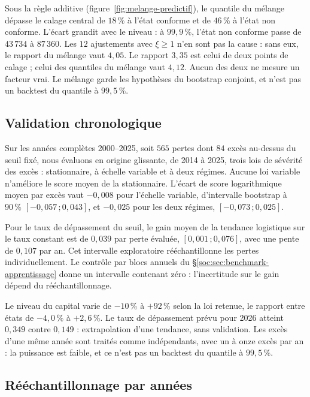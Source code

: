 Sous la règle additive (figure~\ref{fig:melange-predictif}), le quantile du mélange dépasse le calage central de $18\,\%$ à
l'état conforme et de $46\,\%$ à l'état non conforme. L'écart grandit avec le niveau : à $99{,}9\,\%$,
l'état non conforme passe de $43\,734$ à $87\,360$. Les $12$ ajustements avec $\xi\geq1$ n'en
sont pas la cause : sans eux, le rapport du mélange vaut $4{,}05$. Le rapport $3{,}35$ est celui
de deux points de calage ; celui des quantiles du mélange vaut $4{,}12$. Aucun des deux ne
mesure un facteur vrai. Le mélange garde les hypothèses du bootstrap conjoint, et n'est pas un
backtest du quantile à $99{,}5\,\%$.

\subsection{Validation chronologique}
\label{sec:institut-validation-temporelle}

Sur les années complètes 2000--2025, soit $565$ pertes dont $84$ excès au-dessus du seuil fixé,
nous évaluons en origine glissante, de 2014 à 2025, trois lois de sévérité des excès : stationnaire,
à échelle variable et à deux régimes. Aucune loi variable n'améliore le score moyen de la stationnaire. L'écart de score logarithmique
moyen par excès vaut $-0{,}008$ pour l'échelle variable, d'intervalle bootstrap à $90\,\%$
$[-0{,}057\,;0{,}043]$, et $-0{,}025$ pour les deux régimes, $[-0{,}073\,;0{,}025]$.

Pour le taux de
dépassement du seuil, le gain moyen de la tendance logistique sur le taux constant est de $0{,}039$
par perte évaluée, $[0{,}001\,;0{,}076]$, avec une pente de $0{,}107$ par an.
Cet intervalle exploratoire rééchantillonne les pertes individuellement. Le contrôle par blocs
annuels du \S\ref{soc:sec:benchmark-apprentissage} donne un intervalle contenant zéro : l'incertitude sur le gain dépend du rééchantillonnage.



Le niveau du capital varie de $-10\,\%$ à $+92\,\%$ selon la loi retenue, le rapport entre états de
$-4{,}0\,\%$ à $+2{,}6\,\%$. Le taux de dépassement prévu pour 2026 atteint $0{,}349$ contre $0{,}149$ :
extrapolation d'une tendance, sans validation. Les excès d'une même année sont traités comme indépendants, avec un à onze excès par
an : la puissance est faible, et ce n'est pas un backtest du quantile à $99{,}5\,\%$.

\subsection{Rééchantillonnage par années}
\label{sec:institut-reechantillonnage-annuel}

